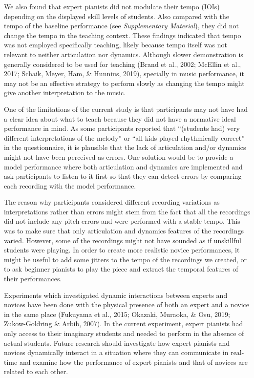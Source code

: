 \documentclass[
  man,floatsintext]{apa6}
\begin{document}
We also found that expert pianists did not modulate their tempo (IOIs) depending on the displayed skill levels of students. Also compared with the tempo of the baseline performance (see \emph{Supplementary Material}), they did not change the tempo in the teaching context. These findings indicated that tempo was not employed specifically teaching, likely because tempo itself was not relevant to neither articulation nor dynamics. Although slower demonstration is generally considered to be used for teaching (Brand et al., 2002; McEllin et al., 2017; Schaik, Meyer, Ham, \& Hunnius, 2019), specially in music performance, it may not be an effective strategy to perform slowly as changing the tempo might give another interpretation to the music.

One of the limitations of the current study is that participants may not have had a clear idea about what to teach because they did not have a normative ideal performance in mind. As some participants reported that ``(students had) very different interpretations of the melody'' or ``all kids played rhythmically correct'' in the questionnaire, it is plausible that the lack of articulation and/or dynamics might not have been perceived as errors. One solution would be to provide a model performance where both articulation and dynamics are implemented and ask participants to listen to it first so that they can detect errors by comparing each recording with the model performance.

The reason why participants considered different recording variations as interpretations rather than errors might stem from the fact that all the recordings did not include any pitch errors and were performed with a stable tempo. This was to make sure that only articulation and dynamics features of the recordings varied. However, some of the recordings might not have sounded as if unskillful students were playing. In order to create more realistic novice performances, it might be useful to add some jitters to the tempo of the recordings we created, or to ask beginner pianists to play the piece and extract the temporal features of their performances.

Experiments which investigated dynamic interactions between experts and novices have been done with the physical presence of both an expert and a novice in the same place (Fukuyama et al., 2015; Okazaki, Muraoka, \& Osu, 2019; Zukow-Goldring \& Arbib, 2007). In the current experiment, expert pianists had only access to their imaginary students and needed to perform in the absence of actual students. Future research should investigate how expert pianists and novices dynamically interact in a situation where they can communicate in real-time and examine how the performance of expert pianists and that of novices are related to each other.
\end{document}
